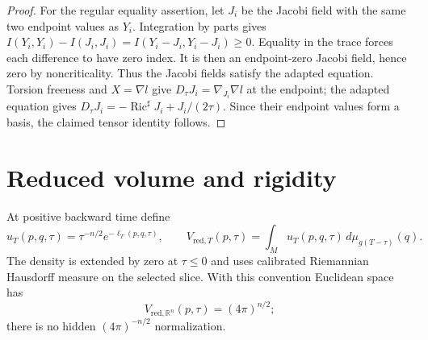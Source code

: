 \begin{proof}
For the regular equality assertion, let $J_i$ be the Jacobi field with the
same two endpoint values as $Y_i$.  Integration by parts gives
$I(Y_i,Y_i)-I(J_i,J_i)=I(Y_i-J_i,Y_i-J_i)\geq0$.
Equality in the trace forces each difference to have zero index.  It is
then an endpoint-zero Jacobi field, hence zero by noncriticality.  Thus the
Jacobi fields satisfy the adapted equation.  Torsion freeness and
$X=\nabla l$ give $D_\tau J_i=\nabla_{J_i}\nabla l$ at the endpoint;
the adapted equation gives
$D_\tau J_i=-\operatorname{Ric}^{\sharp}J_i+J_i/(2\tau)$.
Since their endpoint values form a basis, the claimed tensor identity follows.
\end{proof}

\section{Reduced volume and rigidity}

\begin{definition}
\label{def:reduced-volume}
At positive backward time define
\[
 u_T(p,q,\tau)=\tau^{-n/2}e^{-\ell_T(p,q,\tau)},\qquad
 V_{\mathrm{red},T}(p,\tau)=\int_Mu_T(p,q,\tau)\,d\mu_{g(T-\tau)}(q).
\]
The density is extended by zero at $\tau\leq0$ and uses calibrated Riemannian
Hausdorff measure on the selected slice.  With this convention Euclidean space
has
\[
 V_{\mathrm{red},\mathbb R^n}(p,\tau)=(4\pi)^{n/2};
\]
there is no hidden $(4\pi)^{-n/2}$ normalization.
\end{definition}

